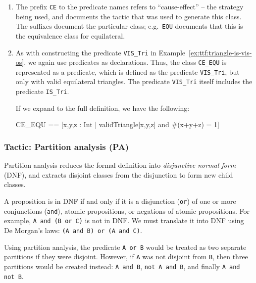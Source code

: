 \begin{enumerate}

 \item The prefix \texttt{CE} to the predicate names refers to ``cause-effect'' -- the strategy being used, and documents the tactic that was used to generate this class. The suffixes document the particular class; e.g.\ \texttt{EQU} documents that this is the equivalence class for equilateral.

 \item As with constructing the predicate \texttt{VIS\_Tri} in Example~\ref{ex:ttf:triangle-is-vis-os}, we again use predicates as declarations. Thus, the class \texttt{CE\_EQU} is represented as a predicate, which is defined as the predicate \texttt{VIS\_Tri}, but only with valid equilateral triangles. The predicate \texttt{VIS\_Tri} itself includes the predicate \texttt{IS\_Tri}.

 If we expand to the full definition, we have the following:

\lstset{aboveskip=3mm}
\lstset{language=}
 \begin{alloy}
CE_EQU == [x,y,z : Int | validTriangle[x,y,z] and #(x+y+z) = 1]
 \end{alloy}
\end{enumerate}


\subsubsection{Tactic: Partition analysis (PA)}

Partition analysis reduces the formal definition into {\em disjunctive normal form} (DNF), and extracts disjoint classes from the disjunction to form new child classes.

A proposition is in DNF if and only if it is a disjunction (\texttt{or}) of one or more conjunctions (\texttt{and}), atomic propositions, or negations of atomic propositions. For example, \verb+A and (B or C)+ is not in DNF. We must translate it into DNF using De Morgan's laws: \verb+(A and B) or (A and C)+.

Using partition analysis, the predicate \verb+A or B+ would be treated as two separate partitions if they were disjoint. However, if \texttt{A} was not disjoint from \texttt{B}, then three partitions would be created instead: \verb+A and B+, \verb+not A and B+, and finally \verb+A and not B+.


